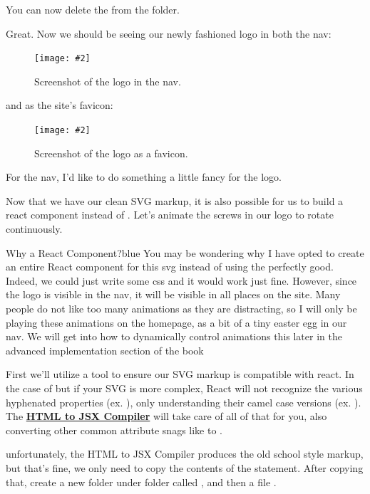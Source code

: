 \documentclass[paper=6in:9in,pagesize=pdftex,headinclude=on,footinclude=on,12pt]{scrbook}
\newcommand{\link}[2]{\textbf{\textcolor{monokaiPink}{\href{#2}{#1}}}}
\newcommand{\standardfigure}[3]{\begin{figure}[H]\begin{center}\texttt{[image: \#2]}\caption{#3}\label{fig:#2}\end{center}\end{figure}}
\begin{document}
You can now delete the  from the  folder.

Great. Now we should be seeing our newly fashioned logo in both the nav:

\standardfigure{\textwidth/3}{frontend/logo-design/nav-screenshot}{Screenshot of the logo in the nav.}

and as the site's favicon:

\standardfigure{\textwidth/3}{frontend/logo-design/favicon-screenshot}{Screenshot of the logo as a favicon.}

For the nav, I'd like to do something a little fancy for the logo.


Now that we have our clean SVG markup, it is also possible for us to build a react component instead of . Let's animate the screws in our logo to rotate continuously.

\begin{highlightBox}{Why a React Component?}{blue}{\information}
You may be wondering why I have opted to create an entire React component for this svg instead of using the perfectly good. Indeed, we could just write some css and it would work just fine. However, since the logo is visible in the nav, it will be visible in all places on the site. Many people do not like too many animations as they are distracting, so I will only be playing these animations on the homepage, as a bit of a tiny easter egg in our nav. We will get into how to dynamically control animations this later in the advanced implementation section of the book
\end{highlightBox}

First we'll utilize a tool to ensure our SVG markup is compatible with react. In the case of  but if your SVG is more complex, React will not recognize the various hyphenated properties (ex. ), only understanding their camel case versions (ex. ). The \link{HTML to JSX Compiler}{https://magic.reactjs.net/htmltojsx.htm} will take care of all of that for you, also converting other common attribute snags like  to .

unfortunately, the HTML to JSX Compiler produces the old school  style markup, but that's fine, we only need to copy the contents of the  statement. After copying that, create a new folder under  folder called , and then a file . 
\end{document}
